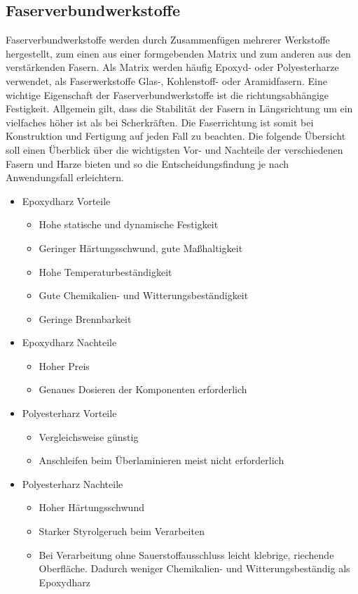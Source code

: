 \documentclass[12pt, a4paper, ngerman]{article}
\begin{document}
\subsection{Faserverbundwerkstoffe}
Faserverbundwerkstoffe werden durch Zusammenfügen mehrerer Werkstoffe hergestellt, zum einen aus einer formgebenden Matrix und zum anderen aus den verstärkenden Fasern. Als Matrix werden häufig Epoxyd- oder Polyesterharze verwendet, als Faserwerkstoffe Glas-, Kohlenstoff- oder Aramidfasern. Eine wichtige Eigenschaft der Faserverbundwerkstoffe ist die richtungsabhängige Festigkeit. Allgemein gilt, dass die Stabilität der Fasern in Längsrichtung um ein vielfaches höher ist als bei Scherkräften. Die Faserrichtung ist somit bei Konstruktion und Fertigung auf jeden Fall zu beachten.  Die folgende Übersicht soll einen Überblick über die wichtigsten Vor- und Nachteile der verschiedenen Fasern und Harze bieten und so die Entscheidungsfindung je nach Anwendungsfall erleichtern.
\begin{itemize}
	\item Epoxydharz Vorteile
	\begin{itemize}
		\item Hohe statische und dynamische Festigkeit
		\item Geringer Härtungsschwund, gute Maßhaltigkeit
		\item Hohe Temperaturbeständigkeit
		\item Gute Chemikalien- und Witterungsbeständigkeit
		\item Geringe Brennbarkeit
	\end{itemize}
	\item Epoxydharz Nachteile
	\begin{itemize}
		\item Hoher Preis
		\item Genaues Dosieren der Komponenten erforderlich
	\end{itemize}
	\item Polyesterharz Vorteile	
	\begin{itemize}
		\item Vergleichsweise günstig
		\item Anschleifen beim Überlaminieren meist nicht erforderlich
	\end{itemize} 
	\item Polyesterharz Nachteile
	\begin{itemize}
		\item Hoher Härtungsschwund
		\item Starker Styrolgeruch beim Verarbeiten
		\item Bei Verarbeitung ohne Sauerstoffausschluss leicht klebrige, riechende Oberfläche. Dadurch weniger Chemikalien- und Witterungsbeständig als Epoxydharz
	\end{itemize}	 
\end{itemize}
\end{document}
